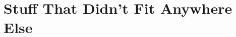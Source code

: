 \documentclass[a4paper,oneside,11pt]{book}
\theoremstyle{definition}
\begin{document}












\appendix
\chapter{Stuff That Didn't Fit Anywhere Else}




\end{document}
